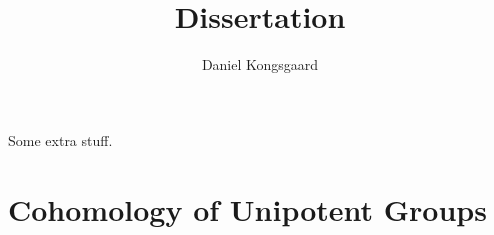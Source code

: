\documentclass[letterpaper,oneside,english,11pt,openany]{memoir}
\title{Dissertation}
\author{Daniel Kongsgaard}
\begin{document}

\frontmatter



\tableofcontents*

\clearpage

\begin{vplace}[0.7]
  Some extra stuff.
\end{vplace}

\clearpage

\mainmatter

\chapter{Cohomology of Unipotent Groups}
\label{cha:cohunigps}



\clearpage

\backmatter

\printbibliography

\clearpage

\printnomenclature[4cm]

\clearpage

\printindex
\end{document}
